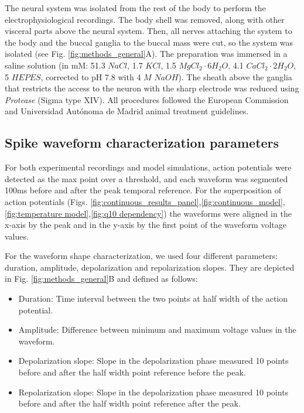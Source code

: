 The neural system was isolated from the rest of the body to perform the electrophysiological recordings. The body shell was removed, along with other visceral parts above the neural system. Then, all nerves attaching the system to the body and the buccal ganglia to the buccal mass were cut, so the system was isolated (see Fig. \ref{fig:methods_general}A). The preparation was immersed in a saline solution (in mM: 51.3 $NaCl$, 1.7 $KCl$, 1.5 $MgCl_2\cdot6H_2O$, 4.1 $CaCl_2\cdot2H_2O$, 5 $HEPES$, corrected to pH 7.8 with 4 $M$ $NaOH$).
The sheath above the ganglia that restricts the access to the neuron with the sharp electrode was reduced using \textit{Protease} (Sigma type XIV). All procedures followed the European Commission and Universidad Autónoma de Madrid animal treatment guidelines.

\subsection{Spike waveform characterization parameters} \label{sec:characterization parameters}
\label{sect:metrics}
For both experimental recordings and model simulations, action potentials were detected as the max point over a threshold, and each waveform was segmented 100ms before and after the peak temporal reference. For the superposition of action potentials (Figs. \ref{fig:continuous_results_panel},\ref{fig:continuous_model},\ref{fig:temperature model},\ref{fig:q10 dependency}) the waveforms were aligned in the x-axis by the peak and in the y-axis by the first point of the waveform voltage values.

For the waveform shape characterization, we used four different parameters: duration, amplitude, depolarization and repolarization slopes. They are depicted in Fig. \ref{fig:methods_general}B and defined as follows:
\begin{itemize}
    \item Duration: Time interval between the two points at half width of the action potential. 
    \item Amplitude: Difference between minimum and maximum voltage values in the waveform. 
    \item Depolarization slope: Slope in the depolarization phase measured 10 points before and after the half width point reference before the peak.
    \item Repolarization slope: Slope in the depolarization phase measured 10 points before and after the half width point reference after the peak.
\end{itemize}

